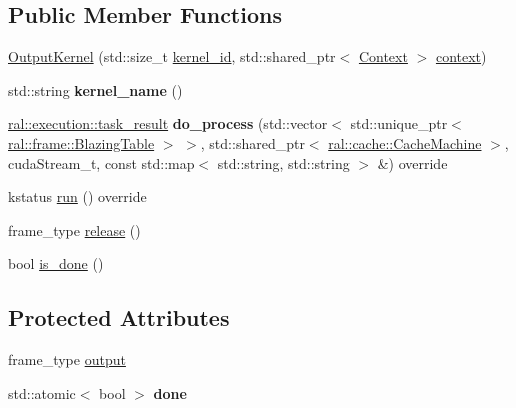 \subsection*{Public Member Functions}
\begin{DoxyCompactItemize}
\item 
\hyperlink{classral_1_1batch_1_1OutputKernel_a549eabea0f9512043cfb21a0ebc38597}{Output\+Kernel} (std\+::size\+\_\+t \hyperlink{classral_1_1cache_1_1kernel_a2fd708656cb056a41ec635b8bdc4acfe}{kernel\+\_\+id}, std\+::shared\+\_\+ptr$<$ \hyperlink{classblazingdb_1_1manager_1_1Context}{Context} $>$ \hyperlink{classral_1_1cache_1_1kernel_af0347d14d678cfa7205c1387746a2e1b}{context})
\item 
\mbox{\label{classral_1_1batch_1_1OutputKernel_ab8d330592b4cf70d0bb6c8c88e1f88d2}} 
std\+::string {\bfseries kernel\+\_\+name} ()
\item 
\mbox{\label{classral_1_1batch_1_1OutputKernel_a99f5b52ae12cb7941eb2c5a102c33d65}} 
\hyperlink{structral_1_1execution_1_1task__result}{ral\+::execution\+::task\+\_\+result} {\bfseries do\+\_\+process} (std\+::vector$<$ std\+::unique\+\_\+ptr$<$ \hyperlink{classral_1_1frame_1_1BlazingTable}{ral\+::frame\+::\+Blazing\+Table} $>$ $>$, std\+::shared\+\_\+ptr$<$ \hyperlink{classral_1_1cache_1_1CacheMachine}{ral\+::cache\+::\+Cache\+Machine} $>$, cuda\+Stream\+\_\+t, const std\+::map$<$ std\+::string, std\+::string $>$ \&) override
\item 
kstatus \hyperlink{classral_1_1batch_1_1OutputKernel_a53519f315635c5e83e958fda42300f9a}{run} () override
\item 
frame\+\_\+type \hyperlink{classral_1_1batch_1_1OutputKernel_adc3b6153007602790ee9045740fce823}{release} ()
\item 
bool \hyperlink{classral_1_1batch_1_1OutputKernel_aeab17b971b0dbef6f892561e120b149c}{is\+\_\+done} ()
\end{DoxyCompactItemize}
\subsection*{Protected Attributes}
\begin{DoxyCompactItemize}
\item 
frame\+\_\+type \hyperlink{classral_1_1batch_1_1OutputKernel_a7dc0969924e0203fc30d9efa0063ddef}{output}
\item 
\mbox{\label{classral_1_1batch_1_1OutputKernel_a8d8a608d11ed0741b57f4518db83883d}} 
std\+::atomic$<$ bool $>$ {\bfseries done}
\end{DoxyCompactItemize}
